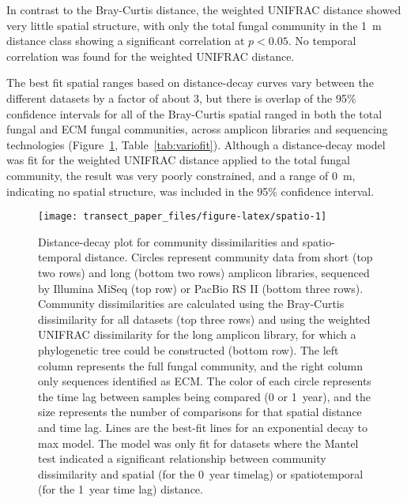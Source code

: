\documentclass[
  12pt,
]{article}
\begin{document}
In contrast to the Bray-Curtis distance, the weighted UNIFRAC distance showed very little spatial structure, with only the total fungal community in the 1~m
distance class showing a significant correlation at \(p < 0.05\).
No temporal correlation was found for the weighted UNIFRAC distance.

The best fit spatial ranges based on distance-decay curves vary between the different datasets by a factor of about 3, but there is overlap of the 95\% confidence intervals for all of the Bray-Curtis spatial ranged in both the total fungal and ECM fungal communities, across amplicon libraries and sequencing technologies (Figure~\ref{fig:spatio}, Table~\ref{tab:variofit}).
Although a distance-decay model was fit for the weighted UNIFRAC distance applied to the total fungal community, the result was very poorly constrained, and a range of 0~m, indicating no spatial structure, was included in the 95\% confidence interval.










\begin{figure}

{\centering \texttt{[image: transect\_paper\_files/figure-latex/spatio-1]} 

}

\caption[Distance-decay plot for community dissimilarities and spatio-temporal distance]{Distance-decay plot for community dissimilarities and spatio-temporal distance. Circles represent community data from short (top two rows) and long (bottom two rows) amplicon libraries, sequenced by Illumina MiSeq (top row) or PacBio RS II (bottom three rows).
Community dissimilarities are calculated using the Bray-Curtis dissimilarity for all datasets (top three rows) and using the weighted UNIFRAC dissimilarity for the long amplicon library, for which a phylogenetic tree could be constructed (bottom row).
The left column represents the full fungal community, and the right column only sequences identified as ECM.
The color of each circle represents the time lag between samples being compared (0 or 1~year), and the size represents the number of comparisons for that spatial distance and time lag.
Lines are the best-fit lines for an exponential decay to max model.
The model was only fit for datasets where the Mantel test indicated a significant relationship between community dissimilarity and spatial (for the 0~year timelag) or spatiotemporal (for the 1~year time lag) distance.}\label{fig:spatio}
\end{figure}
\end{document}
